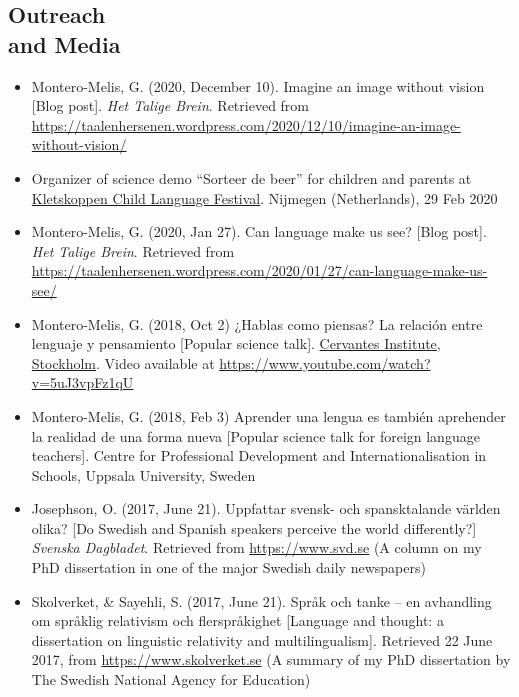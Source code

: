 \documentclass[margin, 11pt]{res} %
\begin{document}
\begin{resume}
\section{\sc Outreach \\and Media}

\begin{itemize}

\item Montero-Melis, G. (2020, December 10). Imagine an image without vision [Blog post]. \emph{Het Talige Brein}. Retrieved from \url{https://taalenhersenen.wordpress.com/2020/12/10/imagine-an-image-without-vision/}

\item Organizer of science demo ``Sorteer de beer'' for children and parents at \href{http://www.kletskoppenfestival.nl/}{Kletskoppen Child Language Festival}. Nijmegen (Netherlands), 29 Feb 2020

\item Montero-Melis, G. (2020, Jan 27). Can language make us see? [Blog post]. \emph{Het Talige Brein}. Retrieved from \url{https://taalenhersenen.wordpress.com/2020/01/27/can-language-make-us-see/}

\item Montero-Melis, G. (2018, Oct 2) ¿Hablas como piensas? La relación entre lenguaje y pensamiento [Popular science talk].  \href{https://cultura.cervantes.es/estocolmo/es/-hablas-como-piensas--la-relacion-entre-el-lenguaje-y-el-pensamiento/122695}{Cervantes Institute, Stockholm}.
Video available at \url{https://www.youtube.com/watch?v=5uJ3vpFz1qU}

\item Montero-Melis, G. (2018, Feb 3) Aprender una lengua es también aprehender la realidad de una forma nueva [Popular science talk for foreign language teachers]. Centre for Professional Development and Internationalisation in Schools, Uppsala University, Sweden

\item Josephson, O. (2017, June 21). Uppfattar svensk- och spansktalande v{\"a}rlden olika? [Do Swedish and Spanish speakers perceive the world differently?] \emph{Svenska Dagbladet}. Retrieved from \url{https://www.svd.se} (A column on my PhD dissertation in one of the major Swedish daily newspapers)

\item Skolverket, \& Sayehli, S. (2017, June 21). Spr{\aa}k och tanke -- en avhandling om spr{\aa}klig relativism och flerspr{\aa}kighet [Language and thought: a dissertation on linguistic relativity and multilingualism]. Retrieved 22 June 2017, from \url{https://www.skolverket.se} (A summary of my PhD dissertation by The Swedish National Agency for Education)


\end{itemize}
\end{resume}
\end{document}
